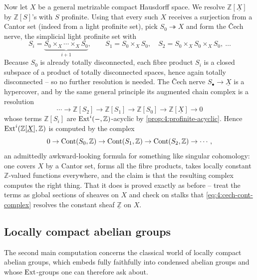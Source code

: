 Now let $X$ be a general metrizable compact Hausdorff space. We resolve
$\mathbb{Z}[\underline{X}]$ by $\mathbb{Z}[S]$'s with $S$ profinite. Using that
every such $X$ receives a surjection from a Cantor set (indeed from a light
profinite set), pick $S_0\twoheadrightarrow X$ and form the \v{C}ech nerve, the
simplicial light profinite set with
\begin{equation*}
S_i=\underbrace{S_0\times_X\cdots\times_X S_0}_{i+1},
\qquad
S_1=S_0\times_X S_0,\quad S_2=S_0\times_X S_0\times_X S_0,\ \dots
\end{equation*}
Because $S_0$ is already totally disconnected, each fibre product $S_i$ is a
closed subspace of a product of totally disconnected spaces, hence again totally
disconnected -- so no further resolution is needed. The \v{C}ech nerve
$S_\bullet\to\underline{X}$ is a hypercover, and by the same general principle
its augmented chain complex is a resolution
\begin{equation*}
\cdots\to\mathbb{Z}[S_2]\to\mathbb{Z}[S_1]\to\mathbb{Z}[S_0]\to
\mathbb{Z}[\underline{X}]\to0
\end{equation*}
whose terms $\mathbb{Z}[S_i]$ are $\operatorname{Ext}^i(-,\mathbb{Z})$-acyclic by
\cref{prop:4:profinite-acyclic}. Hence $\operatorname{Ext}^{i}(\mathbb{Z}[\underline{X}],
\mathbb{Z})$ is computed by the complex
\begin{equation}
\label{eq:4:cech-cont-complex}
0\to\operatorname{Cont}(S_0,\mathbb{Z})\to\operatorname{Cont}(S_1,\mathbb{Z})\to\operatorname{Cont}(S_2,\mathbb{Z})\to\cdots,
\end{equation}
an admittedly awkward-looking formula for something like singular cohomology: one
covers $X$ by a Cantor set, forms all the fibre products, takes locally constant
$\mathbb{Z}$-valued functions everywhere, and the claim is that the resulting
complex computes the right thing. That it does is proved exactly as before --
treat the terms as global sections of sheaves on $X$ and check on stalks that
\eqref{eq:4:cech-cont-complex} resolves the constant sheaf $\underline{\mathbb{Z}}$
on $X$.

\subsection{Locally compact abelian groups}

The second main computation concerns the classical world of locally compact
abelian groups, which embeds fully faithfully into condensed abelian groups and
whose $\operatorname{Ext}$-groups one can therefore ask about.

